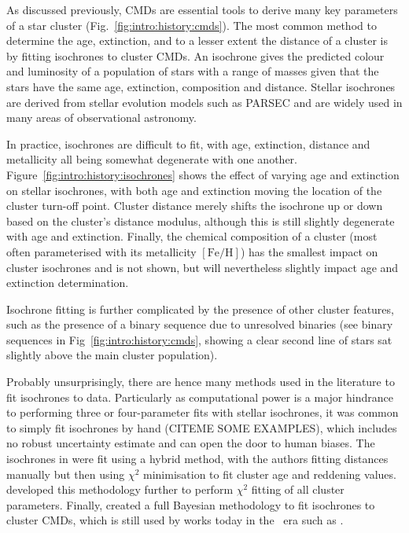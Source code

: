 As discussed previously, CMDs are essential tools to derive many key parameters of a star cluster (Fig.~\ref{fig:intro:history:cmds}). The most common method to determine the age, extinction, and to a lesser extent the distance of a cluster is by fitting isochrones to cluster CMDs. An isochrone gives the predicted colour and luminosity of a population of stars with a range of masses given that the stars have the same age, extinction, composition and distance. Stellar isochrones are derived from stellar evolution models such as PARSEC \citep{bressan_parsec_2012} and are widely used in many areas of observational astronomy.

In practice, isochrones are difficult to fit, with age, extinction, distance and metallicity all being somewhat degenerate with one another. Figure~\ref{fig:intro:history:isochrones} shows the effect of varying age and extinction on stellar isochrones, with both age and extinction moving the location of the cluster turn-off point. Cluster distance merely shifts the isochrone up or down based on the cluster's distance modulus, although this is still slightly degenerate with age and extinction. Finally, the chemical composition of a cluster (most often parameterised with its metallicity $\left[\text{Fe}/\text{H}\right]$) has the smallest impact on cluster isochrones and is not shown, but will nevertheless slightly impact age and extinction determination.

Isochrone fitting is further complicated by the presence of other cluster features, such as the presence of a binary sequence due to unresolved binaries (see binary sequences in Fig~\ref{fig:intro:history:cmds}, showing a clear second line of stars sat slightly above the main cluster population).

Probably unsurprisingly, there are hence many methods used in the literature to fit isochrones to data. Particularly as computational power is a major hindrance to performing three or four-parameter fits with stellar isochrones, it was common to simply fit isochrones by hand (CITEME SOME EXAMPLES), which includes no robust uncertainty estimate and can open the door to human biases. The isochrones in \cite{kharchenko_global_2013} were fit using a hybrid method, with the authors fitting distances manually but then using $\chi^2$ minimisation to fit cluster age and reddening values. \cite{yen_reanalysis_2018} developed this methodology further to perform $\chi^2$ fitting of all cluster parameters. Finally, \cite{hippel_inverting_2006} created a full Bayesian methodology to fit isochrones to cluster CMDs, which is still used by works today in the \gaia\ era such as \cite{bossini_age_2019}.

